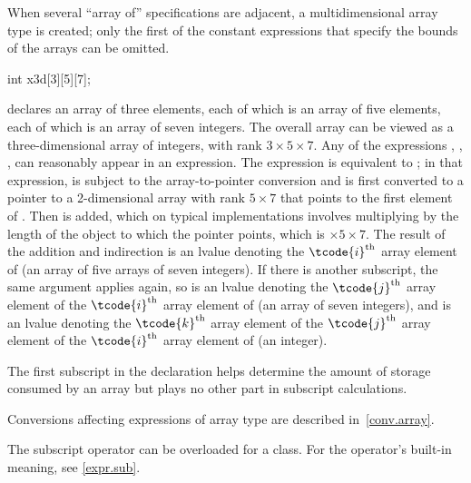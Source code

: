 \pnum
{}%
\begin{note}
When several ``array of'' specifications are adjacent,
a multidimensional array type is created;
only the first of the constant expressions
that specify the bounds of the arrays can be omitted.
\begin{example}
\begin{codeblock}
int x3d[3][5][7];
\end{codeblock}
declares an array of three elements,
each of which is an array of five elements,
each of which is an array of seven integers.
The overall array can be viewed as a
three-dimensional array of integers,
with rank $3 \times 5 \times 7$.
Any of the expressions
,
,
,
can reasonably appear in an expression.
The expression
is equivalent to
;
in that expression,
is subject to the array-to-pointer conversion
and is first converted to
a pointer to a 2-dimensional
array with rank
$5 \times 7$
that points to the first element of .
Then  is added,
which on typical implementations involves multiplying
 by the
length of the object to which the pointer points,
which is $ \times 5 \times 7$.
The result of the addition and indirection is
an lvalue denoting
the $\tcode{i}^\text{th}$ array element of
(an array of five arrays of seven integers).
If there is another subscript,
the same argument applies again, so
 is
an lvalue denoting
the $\tcode{j}^\text{th}$ array element of
the $\tcode{i}^\text{th}$ array element of
(an array of seven integers), and
 is
an lvalue denoting
the $\tcode{k}^\text{th}$ array element of
the $\tcode{j}^\text{th}$ array element of
the $\tcode{i}^\text{th}$ array element of
(an integer).
\end{example}
The first subscript in the declaration helps determine
the amount of storage consumed by an array
but plays no other part in subscript calculations.
\end{note}

\pnum
\begin{note}
Conversions affecting expressions of array type are described in~\ref{conv.array}.
\end{note}

\pnum
\begin{note}
The subscript operator can be overloaded for a class.
For the operator's built-in meaning, see \ref{expr.sub}.
\end{note}

